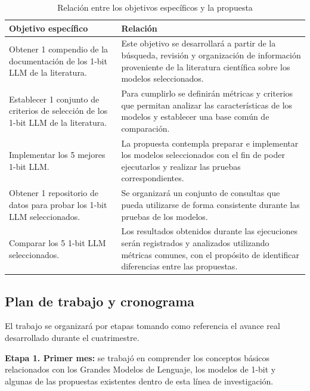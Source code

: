 \begin{table}[H]
\centering
\small
\caption{Relación entre los objetivos específicos y la propuesta}
\label{tab:relacion_objetivos}

\begin{tabular}{L{5.8cm} L{8.2cm}}
\toprule
\textbf{Objetivo específico} & \textbf{Relación} \\
\midrule

Obtener 1 compendio de la documentación de los 1-bit LLM de la literatura.
&
Este objetivo se desarrollará a partir de la búsqueda, revisión y organización de información proveniente de la literatura científica sobre los modelos seleccionados.
\\
\midrule

Establecer 1 conjunto de criterios de selección de los 1-bit LLM de la literatura.
&
Para cumplirlo se definirán métricas y criterios que permitan analizar las características de los modelos y establecer una base común de comparación.
\\
\midrule

Implementar los 5 mejores 1-bit LLM.
&
La propuesta contempla preparar e implementar los modelos seleccionados con el fin de poder ejecutarlos y realizar las pruebas correspondientes.
\\
\midrule

Obtener 1 repositorio de datos para probar los 1-bit LLM seleccionados.
&
Se organizará un conjunto de consultas que pueda utilizarse de forma consistente durante las pruebas de los modelos.
\\
\midrule

Comparar los 5 1-bit LLM seleccionados.
&
Los resultados obtenidos durante las ejecuciones serán registrados y analizados utilizando métricas comunes, con el propósito de identificar diferencias entre las propuestas.
\\

\bottomrule
\end{tabular}
\end{table}


\subsection{Plan de trabajo y cronograma}

El trabajo se organizará por etapas tomando como referencia el avance real desarrollado durante el cuatrimestre.

\textbf{Etapa 1. Primer mes:} se trabajó en comprender los conceptos básicos relacionados con los Grandes Modelos de Lenguaje, los modelos de 1-bit y algunas de las propuestas existentes dentro de esta línea de investigación.

